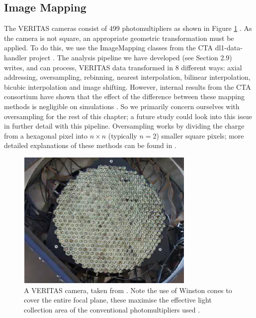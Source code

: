 \subsection{Image Mapping}
\label{sec:map}
The VERITAS cameras consist of 499 photomultipliers as shown in Figure \ref{fig:verc} \cite{vercam}. As the camera is not square, an appropriate geometric transformation must be applied. To do this, we use the ImageMapping classes from the CTA dl1-data-handler project \cite{dl1dh}. The analysis pipeline we have developed (see Section 2.9) writes, and can process, VERITAS data transformed in 8 different ways: axial addressing, oversampling, rebinning, nearest interpolation, bilinear interpolation, bicubic interpolation and image shifting. However, internal results from the CTA consortium have shown that the effect of the difference between these mapping methods is negligible on simulations \cite{nietopc}. So we primarily concern ourselves with oversampling for the rest of this chapter; a future study could look into this issue in further detail with this pipeline. Oversampling works by dividing the charge from a hexagonal pixel into $n\times n$ (typically $n=2$) smaller square pixels; more detailed explanations of these methods can be found in \cite{Hexagdly,nietohexag}.
\begin{figure}[ht]
        \begin{center}
        \includegraphics[width=0.6\columnwidth]{figures/verc.png}

        \caption{
                \label{fig:verc} 
                A VERITAS camera, taken from \cite{vercam}. Note the use of Winston cones to cover the entire focal plane, these maximise the effective light collection area of the conventional photomultipliers used \cite{winston}.
        }
        \end{center}
\end{figure}


